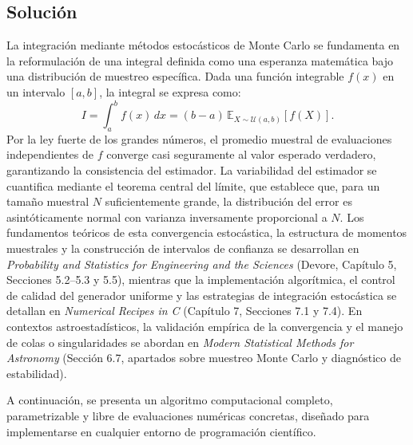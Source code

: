 \documentclass[12pt]{article}
\begin{document}
\subsection{Solución}
La integración mediante métodos estocásticos de Monte Carlo se fundamenta en la reformulación de una integral definida como una esperanza matemática bajo una distribución de muestreo específica. Dada una función integrable $f(x)$ en un intervalo $[a,b]$, la integral se expresa como:
$$
I = \int_a^b f(x) \, dx = (b-a) \, \mathbb{E}_{X \sim \mathcal{U}(a,b)}[f(X)].
$$
Por la ley fuerte de los grandes números, el promedio muestral de evaluaciones independientes de $f$ converge casi seguramente al valor esperado verdadero, garantizando la consistencia del estimador. La variabilidad del estimador se cuantifica mediante el teorema central del límite, que establece que, para un tamaño muestral $N$ suficientemente grande, la distribución del error es asintóticamente normal con varianza inversamente proporcional a $N$. Los fundamentos teóricos de esta convergencia estocástica, la estructura de momentos muestrales y la construcción de intervalos de confianza se desarrollan en \textit{Probability and Statistics for Engineering and the Sciences} (Devore, Capítulo 5, Secciones 5.2--5.3 y 5.5), mientras que la implementación algorítmica, el control de calidad del generador uniforme y las estrategias de integración estocástica se detallan en \textit{Numerical Recipes in C} (Capítulo 7, Secciones 7.1 y 7.4). En contextos astroestadísticos, la validación empírica de la convergencia y el manejo de colas o singularidades se abordan en \textit{Modern Statistical Methods for Astronomy} (Sección 6.7, apartados sobre muestreo Monte Carlo y diagnóstico de estabilidad).

A continuación, se presenta un algoritmo computacional completo, parametrizable y libre de evaluaciones numéricas concretas, diseñado para implementarse en cualquier entorno de programación científico.
\end{document}
